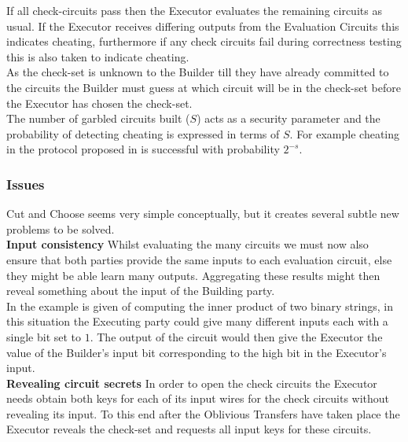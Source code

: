 \documentclass[ %
                    author={Nicholas Tutte},
                supervisor={Prof. Nigel Smart},
                    degree={MEng},
                     title={Secure Two Party Computation},
                  subtitle={A practical comparison of recent protocols},
                      type={Research - GG1K},
                      year={2015} ]{dissertation}
\begin{document}
				If all check-circuits pass then the Executor evaluates the remaining circuits as usual. If the Executor receives differing outputs from the Evaluation Circuits this indicates cheating, furthermore if any check circuits fail during correctness testing this is also taken to indicate cheating.\\

				As the check-set is unknown to the Builder till they have already committed to the circuits the Builder must guess at which circuit will be in the check-set before the Executor has chosen the check-set.\\

				The number of garbled circuits built ($S$) acts as a security parameter and the probability of detecting cheating is expressed in terms of $S$. For example cheating in the protocol proposed in \cite{Lindell_CnC_2013} is successful with probability $2^{-s}$.

			\subsubsection{Issues}
				Cut and Choose seems very simple conceptually, but it creates several subtle new problems to be solved.\\

				\noindent \textbf{Input consistency} Whilst evaluating the many circuits we must now also ensure that both parties provide the same inputs to each evaluation  circuit, else they might be able learn many outputs. Aggregating these results might then reveal something about the input of the Building party.\\

				In \cite{LindellAndPinkas2007} the example is given of computing the inner product of two binary strings, in this situation the Executing party could give many different inputs each with a single bit set to $1$. The output of the circuit would then give the Executor the value of the Builder's input bit corresponding to the high bit in the Executor's input.\\

				\noindent \textbf{Revealing circuit secrets} In order to open the check circuits the Executor needs obtain both keys for each of its input wires for the check circuits without revealing its input. To this end after the Oblivious Transfers have taken place the Executor reveals the check-set and requests all input keys for these circuits.\\
\end{document}
